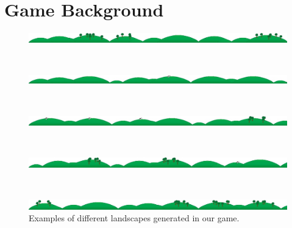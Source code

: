 \chapter{Game Background}\label{app:game_background}
\begin{figure}[h]
\centering
\includegraphics[width=\textwidth, keepaspectratio]{img/screenshots/landscape1.jpg}
\end{figure}~\\

\begin{figure}[h]
\centering
\includegraphics[width=\textwidth, keepaspectratio]{img/screenshots/landscape2.jpg}
\end{figure}~\\

\begin{figure}[h]
\centering
\includegraphics[width=\textwidth, keepaspectratio]{img/screenshots/landscape3.jpg}
\end{figure}~\\

\begin{figure}[h]
\centering
\includegraphics[width=\textwidth, keepaspectratio]{img/screenshots/landscape4.jpg}
\end{figure}~\\

\begin{figure}[h!]
\centering
\includegraphics[width=\textwidth, keepaspectratio]{img/screenshots/landscape5.jpg}
\caption{Examples of different landscapes generated in our game.}
\end{figure}